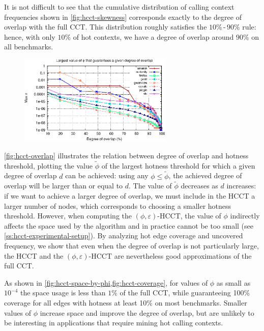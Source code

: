 It is not difficult to see that the cumulative distribution  of calling context frequencies shown in \myfigure\ref{fig:hcct-skewness}  corresponds exactly to the degree of overlap with the full CCT. This distribution roughly satisfies the $10\%\,$-$\,90\%$ rule: hence, with only $10\%$ of hot contexts, we have a degree of overlap around $90\%$ on all benchmarks.

\ifdefined\noauthorea
\begin{figure}[!ht]
\begin{center}
\includegraphics[width=0.65\textwidth]{figures/hcct-overlap/hcct-overlap.eps}
\caption{\protect}
\end{center}
\end{figure}
\fi

\myfigure\ref{fig:hcct-overlap} illustrates the relation between degree of overlap and hotness threshold, plotting the value $\widetilde\phi$ of the largest hotness threshold for which a given degree of overlap $d$ can be achieved: using any $\phi\leq\widetilde\phi$, the achieved degree of overlap will be larger than or equal to $d$. The value of $\widetilde\phi$ decreases as $d$ increases: if we want to achieve a larger degree of overlap, we must include in the HCCT a larger number of nodes, which corresponds to choosing a smaller hotness threshold. However, when computing the $(\phi,\varepsilon)$-HCCT, the value of $\phi$ indirectly affects the space used by the algorithm and in practice cannot be too small (see \mysection\ref{ss:hcct-experimental-setup}). By analyzing hot edge coverage and uncovered frequency, we show that even when the degree of overlap is not particularly large, the HCCT and the $(\phi,\varepsilon)$-HCCT are nevertheless good approximations of the full CCT.

As shown in \myfigure\ref{fig:hcct-space-by-phi,fig:hcct-coverage}, for values of $\phi$ as small as $10^{-4}$ the space usage is less than $1\%$ of the full CCT, while guaranteeing 100\% coverage for all edges with hotness at least 10\% on most benchmarks. Smaller values of $\phi$ increase space and improve the degree of overlap, but are unlikely to be interesting in applications that require mining hot calling contexts.

